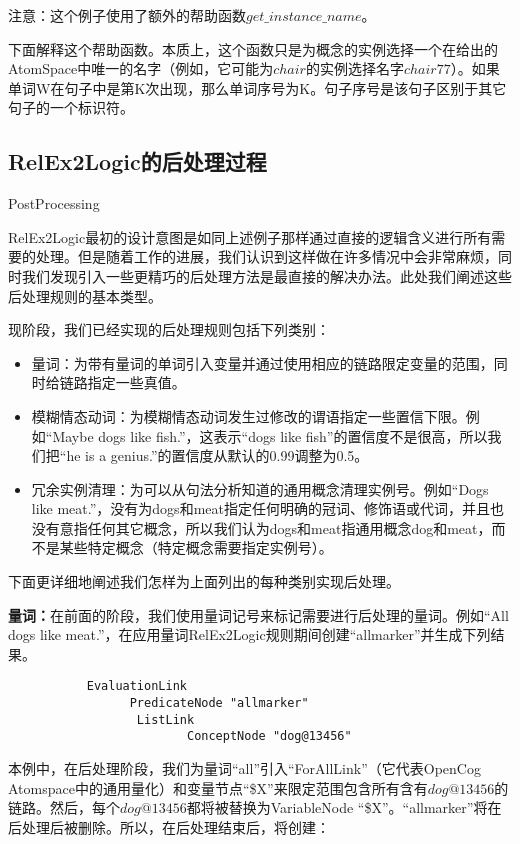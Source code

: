 注意：这个例子使用了额外的帮助函数$get\_instance\_name$。

下面解释这个帮助函数。本质上，这个函数只是为概念的实例选择一个在给出的AtomSpace中唯一的名字（例如，它可能为$chair$的实例选择名字$chair77$）。如果单词W在句子中是第K次出现，那么单词序号为K。句子序号是该句子区别于其它句子的一个标识符。

\subsection{RelEx2Logic的后处理过程}{PostProcessing}

RelEx2Logic最初的设计意图是如同上述例子那样通过直接的逻辑含义进行所有需要的处理。但是随着工作的进展，我们认识到这样做在许多情况中会非常麻烦，同时我们发现引入一些更精巧的后处理方法是最直接的解决办法。此处我们阐述这些后处理规则的基本类型。

现阶段，我们已经实现的后处理规则包括下列类别：

\begin{itemize}
\item 量词：为带有量词的单词引入变量并通过使用相应的链路限定变量的范围，同时给链路指定一些真值。
\item 模糊情态动词：为模糊情态动词发生过修改的谓语指定一些置信下限。例如“Maybe dogs like fish.”，这表示“dogs like fish”的置信度不是很高，所以我们把“he is a genius.”的置信度从默认的0.99调整为0.5。
\item 冗余实例清理：为可以从句法分析知道的通用概念清理实例号。例如“Dogs like meat.”，没有为dogs和meat指定任何明确的冠词、修饰语或代词，并且也没有意指任何其它概念，所以我们认为dogs和meat指通用概念dog和meat，而不是某些特定概念（特定概念需要指定实例号）。
\end{itemize}

下面更详细地阐述我们怎样为上面列出的每种类别实现后处理。

{\bf 量词：}在前面的阶段，我们使用量词记号来标记需要进行后处理的量词。例如“All dogs like meat.”，在应用量词RelEx2Logic规则期间创建“allmarker”并生成下列结果。

\begin{verbatim}
           EvaluationLink
                 PredicateNode "allmarker"
                  ListLink
                         ConceptNode "dog@13456"
\end{verbatim}

本例中，在后处理阶段，我们为量词“all”引入“ForAllLink”（它代表OpenCog Atomspace中的通用量化）和变量节点“\$X”来限定范围包含所有含有$dog@13456$的链路。然后，每个$dog@13456$都将被替换为VariableNode “\$X”。“allmarker”将在后处理后被删除。所以，在后处理结束后，将创建：

